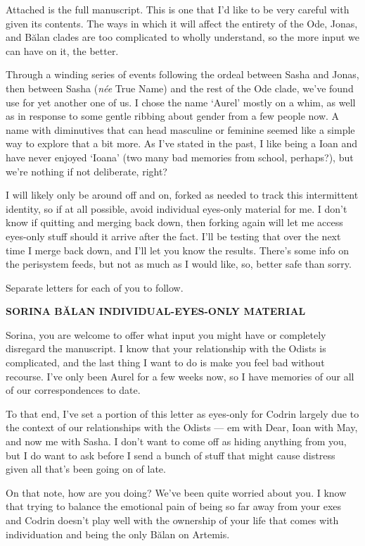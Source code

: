 Attached is the full manuscript. This is one that I'd like to be very careful with given its contents. The ways in which it will affect the entirety of the Ode, Jonas, and Bălan clades are too complicated to wholly understand, so the more input we can have on it, the better.

Through a winding series of events following the ordeal between Sasha and Jonas, then between Sasha (\emph{née} True Name) and the rest of the Ode clade, we've found use for yet another one of us. I chose the name `Aurel' mostly on a whim, as well as in response to some gentle ribbing about gender from a few people now. A name with diminutives that can head masculine or feminine seemed like a simple way to explore that a bit more. As I've stated in the past, I like being a Ioan and have never enjoyed `Ioana' (two many bad memories from school, perhaps?), but we're nothing if not deliberate, right?

I will likely only be around off and on, forked as needed to track this intermittent identity, so if at all possible, avoid individual eyes-only material for me. I don't know if quitting and merging back down, then forking again will let me access eyes-only stuff should it arrive after the fact. I'll be testing that over the next time I merge back down, and I'll let you know the results. There's some info on the perisystem feeds, but not as much as I would like, so, better safe than sorry.

Separate letters for each of you to follow.

\textbf{SORINA BĂLAN INDIVIDUAL-EYES-ONLY MATERIAL}

Sorina, you are welcome to offer what input you might have or completely disregard the manuscript. I know that your relationship with the Odists is complicated, and the last thing I want to do is make you feel bad without recourse. I've only been Aurel for a few weeks now, so I have memories of our all of our correspondences to date.

To that end, I've set a portion of this letter as eyes-only for Codrin largely due to the context of our relationships with the Odists — em with Dear, Ioan with May, and now me with Sasha. I don't want to come off as hiding anything from you, but I do want to ask before I send a bunch of stuff that might cause distress given all that's been going on of late.

On that note, how are you doing? We've been quite worried about you. I know that trying to balance the emotional pain of being so far away from your exes and Codrin doesn't play well with the ownership of your life that comes with individuation and being the only Bălan on Artemis.

